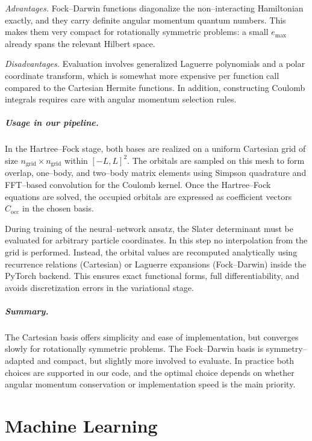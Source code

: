 \emph{Advantages.} 
Fock--Darwin functions diagonalize the non--interacting Hamiltonian exactly, and they carry definite angular momentum quantum numbers. This makes them very compact for rotationally symmetric problems: a small $e_{\max}$ already spans the relevant Hilbert space.

\emph{Disadvantages.} 
Evaluation involves generalized Laguerre polynomials and a polar coordinate transform, which is somewhat more expensive per function call compared to the Cartesian Hermite functions. In addition, constructing Coulomb integrals requires care with angular momentum selection rules.

\paragraph{Usage in our pipeline.}
In the Hartree--Fock stage, both bases are realized on a uniform Cartesian grid of size $n_{\text{grid}}\times n_{\text{grid}}$ within $[-L,L]^2$. The orbitals are sampled on this mesh to form overlap, one--body, and two--body matrix elements using Simpson quadrature and FFT--based convolution for the Coulomb kernel. Once the Hartree--Fock equations are solved, the occupied orbitals are expressed as coefficient vectors $C_{\text{occ}}$ in the chosen basis.

During training of the neural--network ansatz, the Slater determinant must be evaluated for arbitrary particle coordinates. In this step no interpolation from the grid is performed. Instead, the orbital values are recomputed analytically using recurrence relations (Cartesian) or Laguerre expansions (Fock--Darwin) inside the PyTorch backend. This ensures exact functional forms, full differentiability, and avoids discretization errors in the variational stage.

\paragraph{Summary.}
The Cartesian basis offers simplicity and ease of implementation, but converges slowly for rotationally symmetric problems. The Fock--Darwin basis is symmetry--adapted and compact, but slightly more involved to evaluate. In practice both choices are supported in our code, and the optimal choice depends on whether angular momentum conservation or implementation speed is the main priority.

\chapter{Machine Learning}
\label{sec:theory}
